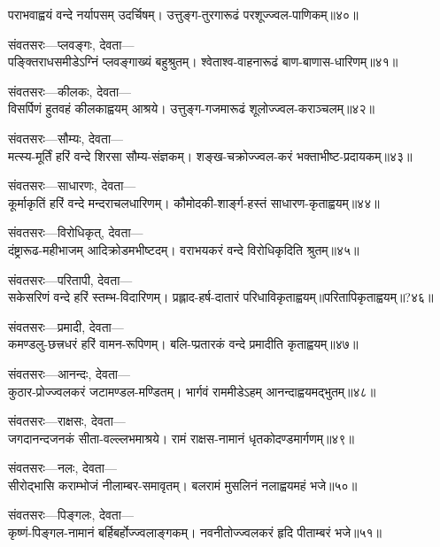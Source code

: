 पराभवाह्वयं वन्दे नर्यापसम् उदर्चिषम्।
उत्तुङ्ग-तुरगारूढं परशूज्ज्वल-पाणिकम्॥४०॥

संवतसरः---प्लवङ्गः, देवता---\\

पङ्क्तिराधसमीडेऽग्निं प्लवङ्गाख्यं बहुश्रुतम्।
श्वेताश्व-वाहनारूढं बाण-बाणास-धारिणम्॥४१॥

संवतसरः---कीलकः, देवता---\\

विसर्पिणं हुतवहं कीलकाह्वयम् आश्रये।
उत्तुङ्ग-गजमारूढं शूलोज्ज्वल-कराञ्चलम्॥४२॥

संवतसरः---सौम्यः, देवता---\\

मत्स्य-मूर्तिं हरिं वन्दे शिरसा सौम्य-संज्ञकम्।
शङ्ख-चक्रोज्ज्वल-करं भक्ताभीष्ट-प्रदायकम्॥४३॥

संवतसरः---साधारणः, देवता---\\

कूर्माकृतिं हरिं वन्दे मन्दराचलधारिणम्।
कौमोदकी-शार्ङ्ग-हस्तं साधारण-कृताह्वयम्॥४४॥

संवतसरः---विरोधिकृत्, देवता---\\

दंष्ट्रारूढ-महीभाजम् आदिक्रोडमभीष्टदम्।
वराभयकरं वन्दे विरोधिकृदिति श्रुतम्॥४५॥

संवतसरः---परितापी, देवता---\\

सकेसरिणं वन्दे हरिं स्तम्भ-विदारिणम्।
प्रह्लाद-हर्ष-दातारं परिधाविकृताह्वयम्॥परितापिकृताह्वयम्॥?४६॥

संवतसरः---प्रमादी, देवता---\\

कमण्डलु-छत्त्रधरं हरिं वामन-रूपिणम्।
बलि-प्प्रतारकं वन्दे प्रमादीति कृताह्वयम्॥४७॥

संवतसरः---आनन्दः, देवता---\\

कुठार-प्रोज्ज्वलकरं जटामण्डल-मण्डितम्।
भार्गवं राममीडेऽहम् आनन्दाह्वयमद्भुतम्॥४८॥

संवतसरः---राक्षसः, देवता---\\

जगदानन्दजनकं सीता-वल्ल्लभमाश्रये।
रामं राक्षस-नामानं धृतकोदण्डमार्गणम्॥४९॥

संवतसरः---नलः, देवता---\\

सीरोद्भासि कराम्भोजं नीलाम्बर-समावृतम्।
बलरामं मुसलिनं नलाह्वयमहं भजे॥५०॥

संवतसरः---पिङ्गलः, देवता---\\

कृष्णं-पिङ्गल-नामानं बर्हिबर्होज्ज्वलाङ्गकम्।
नवनीतोज्ज्वलकरं हृदि पीताम्बरं भजे॥५१॥

